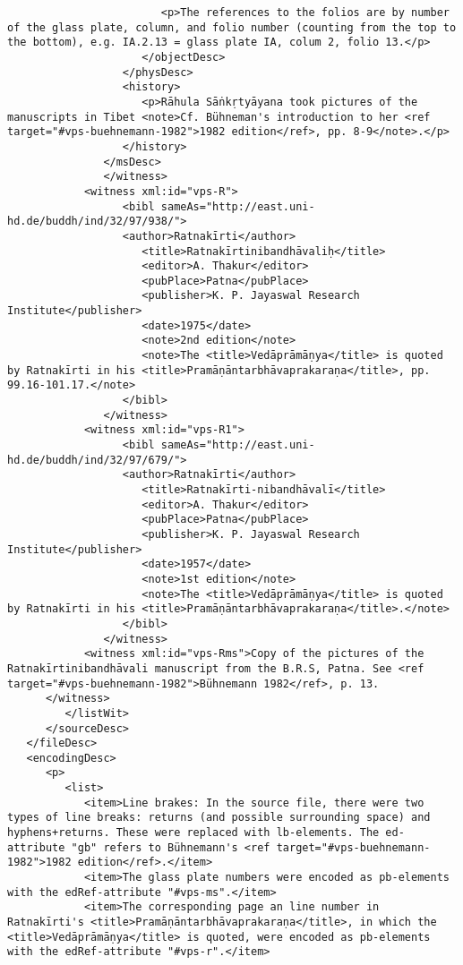 \documentclass[article,12pt,a4paper]{memoir}%
\begin{document}
\begin{verbatim}
                        <p>The references to the folios are by number of the glass plate, column, and folio number (counting from the top to the bottom), e.g. IA.2.13 = glass plate IA, colum 2, folio 13.</p>
                     </objectDesc>
                  </physDesc>
                  <history>
                     <p>Rāhula Sāṅkṛtyāyana took pictures of the manuscripts in Tibet <note>Cf. Bühneman's introduction to her <ref target="#vps-buehnemann-1982">1982 edition</ref>, pp. 8-9</note>.</p>
                  </history>
               </msDesc>
	           </witness>
            <witness xml:id="vps-R">
	              <bibl sameAs="http://east.uni-hd.de/buddh/ind/32/97/938/">
                  <author>Ratnakīrti</author>
	                 <title>Ratnakīrtinibandhāvaliḥ</title>
	                 <editor>A. Thakur</editor>
	                 <pubPlace>Patna</pubPlace>
	                 <publisher>K. P. Jayaswal Research Institute</publisher>
	                 <date>1975</date>
	                 <note>2nd edition</note>
	                 <note>The <title>Vedāprāmāṇya</title> is quoted by Ratnakīrti in his <title>Pramāṇāntarbhāvaprakaraṇa</title>, pp. 99.16-101.17.</note>
	              </bibl>
	           </witness>
            <witness xml:id="vps-R1">
	              <bibl sameAs="http://east.uni-hd.de/buddh/ind/32/97/679/">
                  <author>Ratnakīrti</author>
	                 <title>Ratnakīrti-nibandhāvalī</title>
	                 <editor>A. Thakur</editor>
	                 <pubPlace>Patna</pubPlace>
	                 <publisher>K. P. Jayaswal Research Institute</publisher>
	                 <date>1957</date>
	                 <note>1st edition</note>
	                 <note>The <title>Vedāprāmāṇya</title> is quoted by Ratnakīrti in his <title>Pramāṇāntarbhāvaprakaraṇa</title>.</note>
	              </bibl>
	           </witness>
            <witness xml:id="vps-Rms">Copy of the pictures of the Ratnakīrtinibandhāvali manuscript from the B.R.S, Patna. See <ref target="#vps-buehnemann-1982">Bühnemann 1982</ref>, p. 13.
	  </witness>
         </listWit>
      </sourceDesc>
   </fileDesc>
   <encodingDesc>
      <p>
         <list>
            <item>Line brakes: In the source file, there were two types of line breaks: returns (and possible surrounding space) and hyphens+returns. These were replaced with lb-elements. The ed-attribute "gb" refers to Bühnemann's <ref target="#vps-buehnemann-1982">1982 edition</ref>.</item>
            <item>The glass plate numbers were encoded as pb-elements with the edRef-attribute "#vps-ms".</item>
            <item>The corresponding page an line number in Ratnakīrti's <title>Pramāṇāntarbhāvaprakaraṇa</title>, in which the <title>Vedāprāmāṇya</title> is quoted, were encoded as pb-elements with the edRef-attribute "#vps-r".</item>

\end{verbatim}
\end{document}
